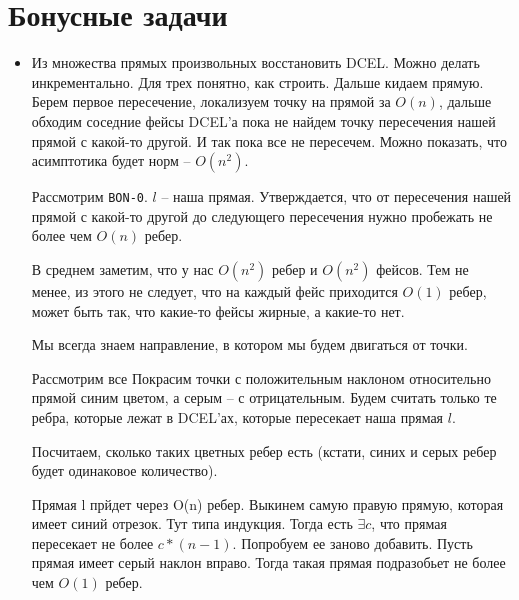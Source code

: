 \documentclass[11pt]{article}
\begin{document}
\section{Бонусные задачи}
\label{sec:orgheadline59}
\begin{itemize}
\item Из множества прямых произвольных восстановить DCEL. Можно делать
инкрементально. Для трех понятно, как строить. Дальше кидаем
прямую. Берем первое пересечение, локализуем точку на прямой за
\(O(n)\), дальше обходим соседние фейсы DCEL'а пока не найдем точку
пересечения нашей прямой с какой-то другой. И так пока все не
пересечем. Можно показать, что асимптотика будет норм --
\(O(n^2)\).

Рассмотрим \texttt{BON-0}. \(l\) -- наша прямая. Утверждается, что от
пересечения нашей прямой с какой-то другой до следующего
пересечения нужно пробежать не более чем \(O(n)\) ребер.

В среднем заметим, что у нас \(O(n^2)\) ребер и \(O(n^2)\) фейсов. Тем не
менее, из этого не следует, что на каждый фейс приходится \(O(1)\)
ребер, может быть так, что какие-то фейсы жирные, а какие-то нет.

Мы всегда знаем направление, в котором мы будем двигаться от
точки.

Рассмотрим все Покрасим точки с положительным наклоном
относительно прямой синим цветом, а серым -- с
отрицательным. Будем считать только те ребра, которые лежат в
DCEL'ах, которые пересекает наша прямая \(l\).

Посчитаем, сколько таких цветных ребер есть (кстати, синих и серых
ребер будет одинаковое количество).

Прямая l прйдет через O(n) ребер. Выкинем самую правую прямую,
которая имеет синий отрезок. Тут типа индукция. Тогда есть
\(\exists{c}\), что прямая пересекает не более \(c*(n-1)\). Попробуем ее
заново добавить. Пусть прямая имеет серый наклон вправо. Тогда
такая прямая подразобьет не более чем \(O(1)\) ребер.
\end{itemize}
\end{document}
